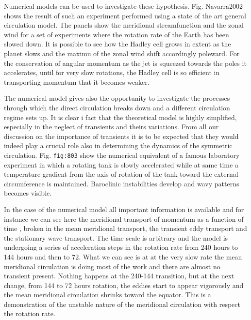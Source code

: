 Numerical models can be used to investigate these hypothesis. Fig.
Navarra2002 shows the result of such an experiment performed using a
state of the art general circulation model. The panels show the
meridional streamfunction and the zonal wind for a set of experiments
where the rotation rate of the Earth has been slowed down. It is
possible to see how the Hadley cell grows in extent as the planet slows
and the maximu of the zonal wind shift accordingly poleward. For the
conservation of angular momentum as the jet is squeezed towards the
poles it accelerates, until for very slow rotations, the Hadley cell is
so efficient in transporting momentum that it becomes weaker.

The numerical model gives also the opportunity to investigate the
processes through which the direct circulation breaks down and a
different circulation regime sets up. It is clear i fact that the
theoretical model is highly simplified, especially in the neglect of
transients and theirs variations. From all our discussion on the
importance of transients it is to be expected that they would indeed
play a crucial role also in determining the dynamics of the symmetric
circulation. Fig. \texttt{fig:803} show the numerical equivalent of a
famous laboratory experiment in which a rotating tank is slowly
accelerated while at same time a temperature gradient from the axis of
rotation of the tank toward the external circumference is maintained.
Baroclinic instabilities develop and wavy patterns becomes visible.

In the case of the numerical model all important information is
available and for instance we can see here the meridional transport of
momentum as a function of time , broken in the mean meridional
transport, the transient eddy transport and the stationary wave
transport. The time scale is arbitrary and the model is undergoing a
series of acceleration steps in the rotation rate from 240 hours to 144
hours and then to 72. What we can see is at at the very slow rate the
mean meridional circulation is doing most of the work and there are
almost no transient present. Nothing happens at the 240-144 transition,
but at the next change, from 144 to 72 hours rotation, the eddies start
to appear vigorously and the mean meridional circulation shrinks toward
the equator. This is a demonstration of the unstable nature of the
meridional circulation with respect the rotation rate.

